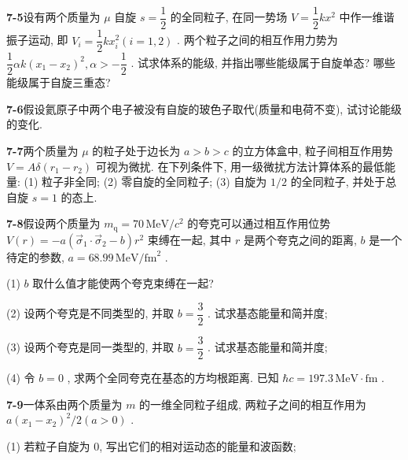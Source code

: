 \newpage

\textbf{7-5}\quad 设有两个质量为 $\displaystyle \mu$ 自旋 $\displaystyle s = \dfrac{1}{2}$ 的全同粒子, 在同一势场 $\displaystyle V = \dfrac{1}{2} kx^{2}$ 中作一维谐振子运动, 即 $\displaystyle V_{i} = \dfrac{1}{2} kx_{i}^{2}(i = 1,2)$ . 两个粒子之间的相互作用力势为 $\displaystyle \dfrac{1}{2}\alpha k(x_{1} - x_{2})^{2}, \alpha > -\dfrac{1}{2}$ . 试求体系的能级, 并指出哪些能级属于自旋单态? 哪些能级属于自旋三重态?

\vfill

\newpage

\textbf{7-6}\quad 假设氦原子中两个电子被没有自旋的玻色子取代(质量和电荷不变), 试讨论能级的变化.

\vfill

\newpage

\textbf{7-7}\quad 两个质量为 $\displaystyle \mu$ 的粒子处于边长为 $\displaystyle a > b > c$ 的立方体盒中, 粒子间相互作用势 $\displaystyle V = A\delta(r_1 - r_2)$ 可视为微扰. 在下列条件下, 用一级微扰方法计算体系的最低能量: (1) 粒子非全同; (2) 零自旋的全同粒子; (3) 自旋为 $\displaystyle 1/2$ 的全同粒子, 并处于总自旋 $\displaystyle s = 1$ 的态上.

\vfill

\newpage

\textbf{7-8}\quad 假设两个质量为 $\displaystyle m_{\mathrm{q}} = 70 \, \mathrm{MeV} / c^2$ 的夸克可以通过相互作用位势 $\displaystyle V(r) = -a(\vec{\sigma}_1 \cdot \vec{\sigma}_2 - b)r^2$ 束缚在一起, 其中 $\displaystyle r$ 是两个夸克之间的距离, $\displaystyle b$ 是一个待定的参数, $\displaystyle a = 68.99 \, \mathrm{MeV} / \mathrm{fm}^2$ .

(1) $\displaystyle b$ 取什么值才能使两个夸克束缚在一起?

(2) 设两个夸克是不同类型的, 并取 $\displaystyle b = \dfrac{3}{2}$ . 试求基态能量和简并度;

(3) 设两个夸克是同一类型的, 并取 $\displaystyle b = \dfrac{3}{2}$ . 试求基态能量和简并度;

(4) 令 $\displaystyle b = 0$ , 求两个全同夸克在基态的方均根距离. 已知 $\displaystyle \hbar c = 197.3 \, \mathrm{MeV} \cdot \mathrm{fm}$ .

\vfill

\newpage

\textbf{7-9}\quad 一体系由两个质量为 $\displaystyle m$ 的一维全同粒子组成, 两粒子之间的相互作用为 $\displaystyle a(x_{1} - x_{2})^{2} / 2 (a > 0)$ .

(1) 若粒子自旋为 0, 写出它们的相对运动态的能量和波函数;


